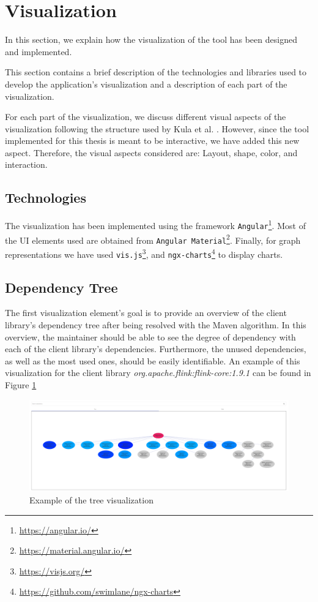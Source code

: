\section{Visualization}
In this section, we explain how the visualization of the tool has been designed and implemented.

This section contains a brief description of the technologies and libraries used to develop the application's visualization and a description of each part of the visualization.

For each part of the visualization, we discuss different visual aspects of the visualization following the structure used by Kula et al. \cite{kula2014visualizing}. However, since the tool implemented for this thesis is meant to be interactive, we have added this new aspect. Therefore, the visual aspects considered are: Layout, shape, color, and interaction.

\subsection{Technologies}
The visualization has been implemented using the framework \texttt{Angular}\footnote{\url{https://angular.io/}}. Most of the UI elements used are obtained from \texttt{Angular Material}\footnote{\url{https://material.angular.io/}}. Finally, for graph representations we have used \texttt{vis.js}\footnote{\url{https://visjs.org/}}, and \texttt{ngx-charts}\footnote{\url{https://github.com/swimlane/ngx-charts}} to display charts.

\subsection{Dependency Tree}\label{sec:visualization-dependency-tree}
The first visualization element's goal is to provide an overview of the client library's dependency tree after being resolved with the Maven algorithm. In this overview, the maintainer should be able to see the degree of dependency with each of the client library's dependencies. Furthermore, the unused dependencies, as well as the most used ones, should be easily identifiable. An example of this visualization for the client library \textit{org.apache.flink:flink-core:1.9.1} can be found in Figure \ref{fig:tree-visualization}

\begin{figure}[ht]
\begin{center}
\includegraphics[width=\textwidth]{figures/tree-visualization.png}
\caption{Example of the tree visualization}
\label{fig:tree-visualization}
\end{center}
\end{figure}

